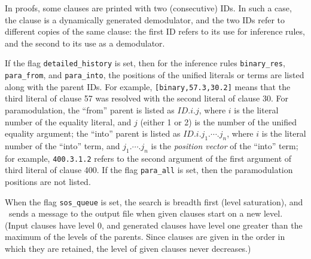 \documentclass[11pt]{article}
\begin{document}
In proofs, some clauses are printed with two (consecutive) IDs.
In such a case, the clause is a dynamically generated demodulator,
and the two IDs refer to different copies of the same clause:
the first ID refers to its use for inference rules, and the second
to its use as a demodulator.

If the flag \verb:detailed_history: is set, then for the inference
rules \verb:binary_res:, \verb:para_from:, and \verb:para_into:,
the positions of the unified literals or terms are listed along
with the parent IDs.  For example, \verb:[binary,57.3,30.2]:
means that the third literal of clause 57 was resolved with
the second literal of clause 30.  For paramodulation, the
``from'' parent is listed as $ID.i.j$, where $i$ is the
literal number of the equality literal, and $j$ (either 1 or 2)
is the number of the unified equality argument; the ``into''
parent is listed as $ID.i.j_1.\cdots.j_n$, where $i$ is the
literal number of the ``into'' term, and $j_1.\cdots.j_n$
is the {\em position vector} of the ``into'' term; for example,
\verb:400.3.1.2: refers to the second argument of the
first argument of third literal of clause 400.  If the flag
\verb:para_all: is set, then the paramodulation positions 
are not listed.

When the flag \verb:sos_queue: is set, the search is breadth first
(level saturation), and \otter\ sends a message to the output file
when given clauses start on a new level.
(Input clauses have level 0, and generated
clauses have level one greater than the maximum of the levels of the 
parents.
Since clauses are given in the order in which they are retained,
the level of given clauses never decreases.)
\end{document}
